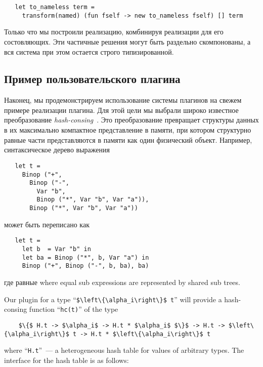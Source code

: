 \begin{lstlisting}
   let to_nameless term =
     transform(named) (fun fself -> new to_nameless fself) [] term
\end{lstlisting}

Только что мы построили реализацию, комбинируя реализации для его состовляющих. Эти частичные решения могут быть раздельно скомпонованы, а вся система при этом остается строго типизированной.

\subsection{Пример пользовательского плагина}
\label{pluginExample}

Наконец, мы продемонстрируем использование системы плагинов на свежем примере реализации плагина. Для этой цели мы выбрали широко известное преобразование \emph{hash-consing}~\cite{HC}. Это преобразование превращает структуры данных в их максимально компактное представление в памяти, при котором структурно равные части представляются в памяти как один физический объект. Например, синтаксическое дерево выражения

\begin{lstlisting}
   let t =
     Binop ("+",
       Binop ("-",
         Var "b",
         Binop ("*", Var "b", Var "a")),
       Binop ("*", Var "b", Var "a"))
\end{lstlisting}

может быть переписано  как

\begin{lstlisting}
   let t =
     let b  = Var "b" in
     let ba = Binop ("*", b, Var "a") in
     Binop ("+", Binop ("-", b, ba), ba)  
\end{lstlisting}

где равные 
where equal sub expressions are represented by shared sub trees.

Our plugin for a type ``\lstinline|$\left\{\alpha_i\right\}$ t|'' will provide a hash-consing function ``\lstinline{hc(t)}'' of the type

\begin{lstlisting}
    $\{$ H.t -> $\alpha_i$ -> H.t * $\alpha_i$ $\}$ -> H.t -> $\left\{\alpha_i\right\}$ t -> H.t * $\left\{\alpha_i\right\}$ t
\end{lstlisting}

where ``\lstinline{H.t}''~--- a heterogeneous hash table for values of arbitrary types. The interface for the hash table is
as follows:

